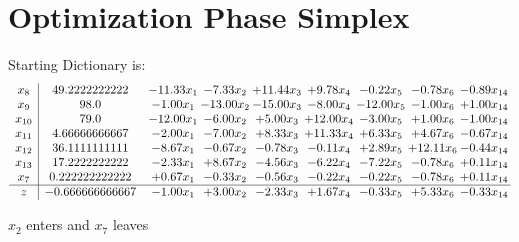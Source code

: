\documentclass[9pt]{article}
\begin{document}
\section{Optimization Phase Simplex}
Starting Dictionary is:
\[\begin{array}{c| c c@{\hskip 2pt} c@{\hskip 2pt} c@{\hskip 2pt} c@{\hskip 2pt} c@{\hskip 2pt} c@{\hskip 2pt} c@{\hskip 2pt} }
 x_{8}   &  49.2222222222 & -11.33 x_{1} & -7.33 x_{2} & + 11.44 x_{3} & +  9.78 x_{4} & -0.22 x_{5} & -0.78 x_{6} & -0.89 x_{14}\\
 x_{9}   &  98.0 & -1.00 x_{1} & -13.00 x_{2} & -15.00 x_{3} & -8.00 x_{4} & -12.00 x_{5} & -1.00 x_{6} & +  1.00 x_{14}\\
 x_{10}   &  79.0 & -12.00 x_{1} & -6.00 x_{2} & +  5.00 x_{3} & + 12.00 x_{4} & -3.00 x_{5} & +  1.00 x_{6} & -1.00 x_{14}\\
 x_{11}   &  4.66666666667 & -2.00 x_{1} & -7.00 x_{2} & +  8.33 x_{3} & + 11.33 x_{4} & +  6.33 x_{5} & +  4.67 x_{6} & -0.67 x_{14}\\
 x_{12}   &  36.1111111111 & -8.67 x_{1} & -0.67 x_{2} & -0.78 x_{3} & -0.11 x_{4} & +  2.89 x_{5} & + 12.11 x_{6} & -0.44 x_{14}\\
 x_{13}   &  17.2222222222 & -2.33 x_{1} & +  8.67 x_{2} & -4.56 x_{3} & -6.22 x_{4} & -7.22 x_{5} & -0.78 x_{6} & +  0.11 x_{14}\\
 x_{7}   &  0.222222222222 & +  0.67 x_{1} & -0.33 x_{2} & -0.56 x_{3} & -0.22 x_{4} & -0.22 x_{5} & -0.78 x_{6} & +  0.11 x_{14}\\
\hline
z    &  -0.666666666667 & -1.00 x_{1} & +  3.00 x_{2} & -2.33 x_{3} & +  1.67 x_{4} & -0.33 x_{5} & +  5.33 x_{6} & -0.33 x_{14}\\
\end{array}\]


 $ x_{2} $ enters and $ x_{7} $ leaves 
\end{document}
